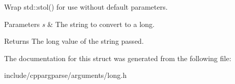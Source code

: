 Wrap std\+::stol() for use without default parameters. 


\begin{DoxyParams}{Parameters}
{\em s} & The string to convert to a long.\\
\hline
\end{DoxyParams}
\begin{DoxyReturn}{Returns}
The long value of the string passed. 
\end{DoxyReturn}


The documentation for this struct was generated from the following file\+:\begin{DoxyCompactItemize}
\item 
include/cppargparse/arguments/long.\+h\end{DoxyCompactItemize}
